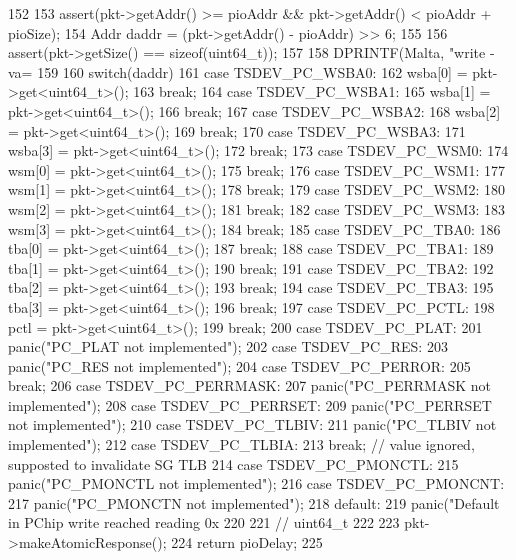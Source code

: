 \begin{DoxyCode}
152 {
153     assert(pkt->getAddr() >= pioAddr && pkt->getAddr() < pioAddr + pioSize);
154     Addr daddr = (pkt->getAddr() - pioAddr) >> 6;
155 
156     assert(pkt->getSize() == sizeof(uint64_t));
157 
158     DPRINTF(Malta, "write - va=%
159 
160     switch(daddr) {
161         case TSDEV_PC_WSBA0:
162               wsba[0] = pkt->get<uint64_t>();
163               break;
164         case TSDEV_PC_WSBA1:
165               wsba[1] = pkt->get<uint64_t>();
166               break;
167         case TSDEV_PC_WSBA2:
168               wsba[2] = pkt->get<uint64_t>();
169               break;
170         case TSDEV_PC_WSBA3:
171               wsba[3] = pkt->get<uint64_t>();
172               break;
173         case TSDEV_PC_WSM0:
174               wsm[0] = pkt->get<uint64_t>();
175               break;
176         case TSDEV_PC_WSM1:
177               wsm[1] = pkt->get<uint64_t>();
178               break;
179         case TSDEV_PC_WSM2:
180               wsm[2] = pkt->get<uint64_t>();
181               break;
182         case TSDEV_PC_WSM3:
183               wsm[3] = pkt->get<uint64_t>();
184               break;
185         case TSDEV_PC_TBA0:
186               tba[0] = pkt->get<uint64_t>();
187               break;
188         case TSDEV_PC_TBA1:
189               tba[1] = pkt->get<uint64_t>();
190               break;
191         case TSDEV_PC_TBA2:
192               tba[2] = pkt->get<uint64_t>();
193               break;
194         case TSDEV_PC_TBA3:
195               tba[3] = pkt->get<uint64_t>();
196               break;
197         case TSDEV_PC_PCTL:
198               pctl = pkt->get<uint64_t>();
199               break;
200         case TSDEV_PC_PLAT:
201               panic("PC_PLAT not implemented\n");
202         case TSDEV_PC_RES:
203               panic("PC_RES not implemented\n");
204         case TSDEV_PC_PERROR:
205               break;
206         case TSDEV_PC_PERRMASK:
207               panic("PC_PERRMASK not implemented\n");
208         case TSDEV_PC_PERRSET:
209               panic("PC_PERRSET not implemented\n");
210         case TSDEV_PC_TLBIV:
211               panic("PC_TLBIV not implemented\n");
212         case TSDEV_PC_TLBIA:
213               break; // value ignored, supposted to invalidate SG TLB
214         case TSDEV_PC_PMONCTL:
215               panic("PC_PMONCTL not implemented\n");
216         case TSDEV_PC_PMONCNT:
217               panic("PC_PMONCTN not implemented\n");
218         default:
219             panic("Default in PChip write reached reading 0x%
220 
221     } // uint64_t
222 
223     pkt->makeAtomicResponse();
224     return pioDelay;
225 }
\end{DoxyCode}


